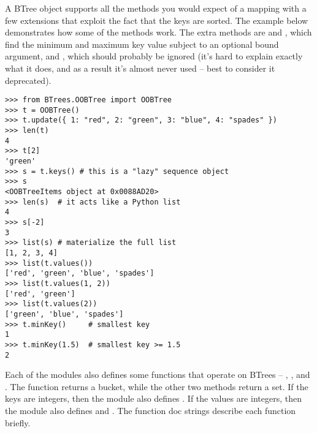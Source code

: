 A BTree object supports all the methods you would expect of a mapping
with a few extensions that exploit the fact that the keys are sorted.
The example below demonstrates how some of the methods work.  The
extra methods are  and , which
find the minimum and maximum key value subject to an optional bound
argument, and , which should probably be ignored
(it's hard to explain exactly what it does, and as a result it's
almost never used -- best to consider it deprecated).

\begin{verbatim}
>>> from BTrees.OOBTree import OOBTree
>>> t = OOBTree()
>>> t.update({ 1: "red", 2: "green", 3: "blue", 4: "spades" })
>>> len(t)
4
>>> t[2]
'green'
>>> s = t.keys() # this is a "lazy" sequence object
>>> s
<OOBTreeItems object at 0x0088AD20>
>>> len(s)  # it acts like a Python list
4
>>> s[-2]
3
>>> list(s) # materialize the full list
[1, 2, 3, 4]
>>> list(t.values())
['red', 'green', 'blue', 'spades']
>>> list(t.values(1, 2))
['red', 'green']
>>> list(t.values(2))
['green', 'blue', 'spades']
>>> t.minKey()     # smallest key
1
>>> t.minKey(1.5)  # smallest key >= 1.5
2
\end{verbatim}

Each of the modules also defines some functions that operate on
BTrees -- , , and
.  The  function returns
a bucket, while the other two methods return a set.
If the keys are integers, then the module also defines
.  If the values are integers, then the module
also defines  and
.  The function doc strings describe each
function briefly.

